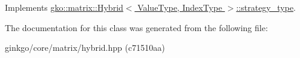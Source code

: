 Implements \hyperlink{classgko_1_1matrix_1_1Hybrid_1_1strategy__type_a0a0cd4024f27c7d0f286f35fc0a6de60}{gko\+::matrix\+::\+Hybrid$<$ Value\+Type, Index\+Type $>$\+::strategy\+\_\+type}.



The documentation for this class was generated from the following file\+:\begin{DoxyCompactItemize}
\item 
ginkgo/core/matrix/hybrid.\+hpp (c71510aa)\end{DoxyCompactItemize}
